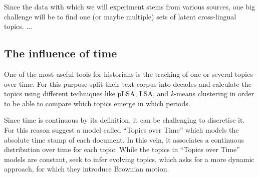 Since the data with which we will experiment stems from various sources, one big challenge will be to find one (or maybe multiple) sets of latent cross-lingual topics.  ...

\subsection{The influence of time}
\label{timeinfluence}
One of the most useful tools for historians is the tracking of one or several topics over time. For this purpose \citet{newmanprobabilistic2006} split their text corpus into decades and calculate the topics using different techniques like pLSA, LSA, and \textit{k}-means clustering in order to be able to compare which topics emerge in which periods.

Since time is continuous by its definition, it can be challenging to discretise it. For this reason \citet{wangtopics2006} suggest a model called ``Topics over Time'' which models the absolute time stamp of each document. In this vein, it associates a continuous distribution over time for each topic. While the topics in ``Topics over Time'' models are constant, \citet{wangcontinuous2012} seek to infer evolving topics, which asks for a more dynamic approach, for which they introduce Brownian motion. 

